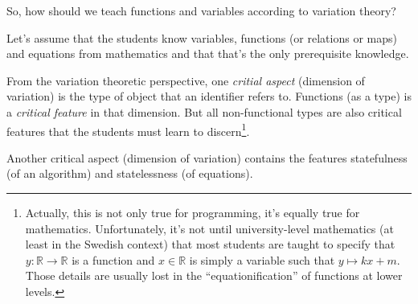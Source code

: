 So, how should we teach functions and variables according to variation theory?
\begin{frame}
  \begin{assumption}
    Let's assume that the students know variables, functions (or relations or 
    maps) and equations from mathematics and that that's the only prerequisite 
    knowledge.
  \end{assumption}
\end{frame}

From the variation theoretic perspective, one \emph{critial aspect} (dimension 
of variation) is the type of object that an identifier refers to.
Functions (as a type) is a \emph{critical feature} in that dimension.
But all non-functional types are also critical features that the students must 
learn to discern\footnote{%
  Actually, this is not only true for programming, it's equally true for 
  mathematics.
  Unfortunately, it's not until university-level mathematics (at least in the 
  Swedish context) that most students are taught to specify that \(y\colon 
  \mathbb{R}\to \mathbb{R}\) is a function and \(x\in\mathbb{R}\) is simply a 
  variable such that \(y\mapsto kx + m\).
  Those details are usually lost in the \enquote{equationification} of 
  functions at lower levels.
}.

Another critical aspect (dimension of variation) contains the features 
statefulness (of an algorithm) and statelessness (of equations).


